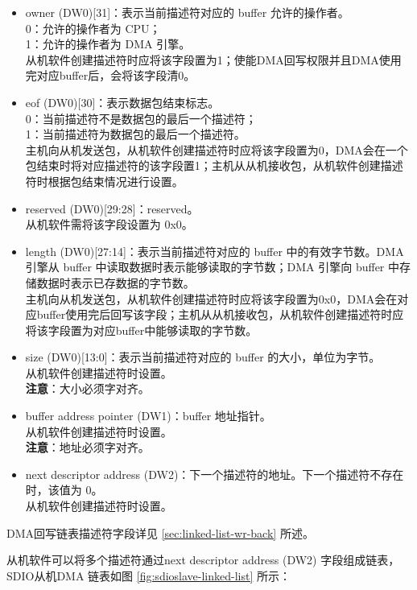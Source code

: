 \documentclass[main\_\_CN.tex]{subfiles}
\begin{document}
\begin{itemize}
    \item owner (DW0)[31]：表示当前描述符对应的 buffer 允许的操作者。\\
    0：允许的操作者为 CPU；\\
    1：允许的操作者为 DMA 引擎。\\
    从机软件创建描述符时应将该字段置为1；使能DMA回写权限并且DMA使用完对应buffer后，会将该字段清0。
    \item eof (DW0)[30]：表示数据包结束标志。\\
    0：当前描述符不是数据包的最后一个描述符；\\
    1：当前描述符为数据包的最后一个描述符。\\
    主机向从机发送包，从机软件创建描述符时应将该字段置为0，DMA会在一个包结束时将对应描述符的该字段置1；主机从从机接收包，从机软件创建描述符时根据包结束情况进行设置。
    \item reserved (DW0)[29:28]：reserved。\\
    从机软件需将该字段设置为 0x0。
    \item length (DW0)[27:14]：表示当前描述符对应的 buffer 中的有效字节数。DMA 引擎从 buffer 中读取数据时表示能够读取的字节数；DMA 引擎向 buffer 中存储数据时表示已存数据的字节数。\\
    主机向从机发送包，从机软件创建描述符时应将该字段置为0x0，DMA会在对应buffer使用完后回写该字段；主机从从机接收包，从机软件创建描述符时应将该字段置为对应buffer中能够读取的字节数。
    \item size (DW0)[13:0]：表示当前描述符对应的 buffer 的大小，单位为字节。\\
    从机软件创建描述符时设置。\\
       {\bfseries 注意}：大小必须字对齐。
    \item buffer address pointer (DW1)：buffer 地址指针。\\
    从机软件创建描述符时设置。\\
    {\bfseries 注意}：地址必须字对齐。
    \item next descriptor address (DW2)：下一个描述符的地址。下一个描述符不存在时，该值为 0。\\
    从机软件创建描述符时设置。
\end{itemize}

DMA回写链表描述符字段详见 \ref{sec:linked-list-wr-back} 所述。

从机软件可以将多个描述符通过next descriptor address (DW2) 字段组成链表，SDIO从机DMA 链表如图 \ref{fig:sdioslave-linked-list} 所示：
\end{document}
